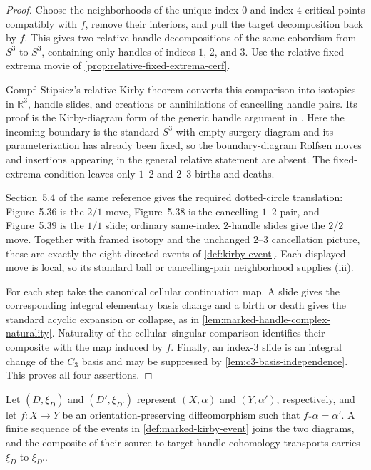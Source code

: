 \begin{proof}
Choose the neighborhoods of the unique index-$0$ and index-$4$ critical
points compatibly with $f$, remove their interiors, and pull the target
decomposition back by $f$.  This gives two relative handle decompositions of
the same cobordism from $S^3$ to $S^3$, containing only handles of indices
$1$, $2$, and $3$.  Use the relative fixed-extrema movie of
\cref{prop:relative-fixed-extrema-cerf}.

Gompf--Stipsicz's relative Kirby theorem
\cite[Theorem~5.5.3]{GompfStipsicz1999} converts this comparison into
isotopies in $\mathbb R^3$, handle slides, and creations or annihilations of
cancelling handle pairs.  Its proof is the Kirby-diagram form of the generic
handle argument in \cite[Theorem~4.2.12]{GompfStipsicz1999}.  Here the
incoming boundary is the standard $S^3$ with empty surgery diagram and its
parameterization has already been fixed, so the boundary-diagram Rolfsen
moves and insertions appearing in the general relative statement are absent.
The fixed-extrema condition leaves only $1$--$2$ and $2$--$3$ births and
deaths.

Section~5.4 of the same reference gives the required dotted-circle
translation: Figure~5.36 is the $2/1$ move, Figure~5.38 is the cancelling
$1$--$2$ pair, and Figure~5.39 is the $1/1$ slide; ordinary same-index
$2$-handle slides give the $2/2$ move.  Together with framed isotopy and the
unchanged $2$--$3$ cancellation picture, these are exactly the eight directed
events of \cref{def:kirby-event}.  Each displayed move is local, so its
standard ball or cancelling-pair neighborhood supplies (iii).

For each step take the canonical cellular continuation map.  A slide gives
the corresponding integral elementary basis change and a birth or death
gives the standard acyclic expansion or collapse, as in
\cref{lem:marked-handle-complex-naturality}.  Naturality of the
cellular--singular comparison identifies their composite with the map induced
by $f$.  Finally, an index-$3$ slide is an integral change of the $C_3$ basis
and may be suppressed by \cref{lem:c3-basis-independence}.  This proves all
four assertions.
\end{proof}

\begin{theorem}
\label{prop:marked-kirby-cerf}
Let $(D,\xi_D)$ and $(D',\xi_{D'})$ represent $(X,\alpha)$ and
$(Y,\alpha')$, respectively, and let $f\colon X\to Y$ be an
orientation-preserving diffeomorphism such that $f_*\alpha=\alpha'$.  A
finite sequence of the events in
\cref{def:marked-kirby-event} joins the two diagrams, and the composite of
their source-to-target handle-cohomology transports carries $\xi_D$ to
$\xi_{D'}$.
\end{theorem}

